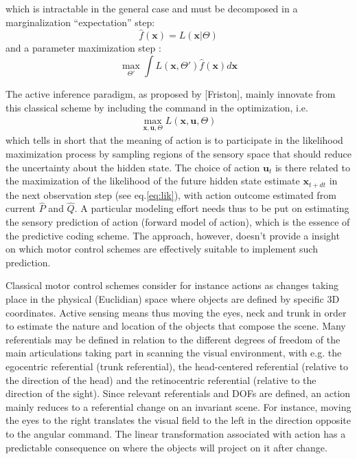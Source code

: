 \documentclass[11pt]{article}
\begin{document}
which is intractable in the general case and must be decomposed in a marginalization ``expectation'' step:
$$\hat{f}(\boldsymbol{x}) = L(\boldsymbol{x}|\Theta)$$
and a parameter maximization step :
$$\max_{\Theta'} \int L(\boldsymbol{x},\Theta')
\hat{f}(\boldsymbol{x}) d\boldsymbol{x} \label{eq:Dempster}$$

The active inference paradigm, as proposed by [Friston], mainly innovate from this classical scheme by including the command in the optimization, i.e. 
\begin{align}
\max_{\boldsymbol{x},\boldsymbol{u},\Theta} L(\boldsymbol{x},\boldsymbol{u},\Theta)
\end{align}
which tells in short that the meaning of action is to participate in the likelihood maximization process by sampling regions of the sensory space that should reduce the uncertainty about the hidden state. The choice of action $\boldsymbol{u}_t$ is there related to the maximization of the likelihood of the future hidden state estimate $\boldsymbol{x}_{t+dt}$ in the next observation step (see eq.\ref{eq:lik}), with action outcome estimated from current $\hat{P}$ and $\hat{Q}$. A particular modeling effort needs thus to be put on estimating the sensory prediction of action (forward model of action), which is the essence of the predictive coding scheme.  
The approach, however, doesn't provide a insight on which motor control schemes are effectively suitable to implement such prediction.   

Classical motor control schemes consider for instance actions as changes taking place in the physical (Euclidian) space where objects are defined by specific 3D coordinates. Active sensing means thus moving the eyes, neck and trunk in order to estimate the nature and location of the objects that compose the scene.  
Many referentials may be defined in relation to the different degrees of freedom of the main articulations taking part in scanning the visual environment, with e.g. the egocentric referential (trunk referential), the head-centered referential (relative to the direction of the head) and the retinocentric referential (relative to the direction of the sight). Since relevant referentials and DOFs are defined, an action mainly reduces to a referential change on an invariant scene. For instance, moving the eyes to the right translates the visual field to the left in the direction opposite to the angular command. The  linear transformation associated with action has a predictable consequence on where the objects will project on it after change. 
\end{document}
